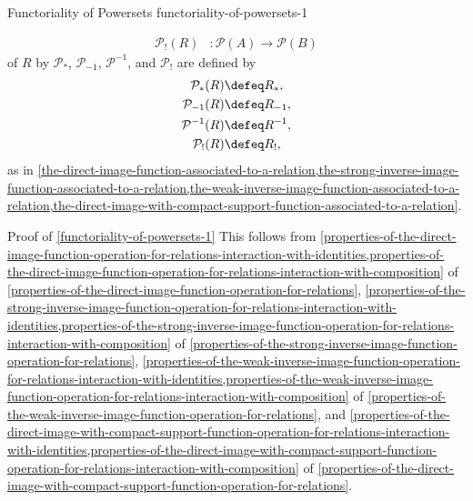 \begin{proposition}{Functoriality of Powersets \rmI}{functoriality-of-powersets-1}
\begin{itemize}
\begin{align*}
                \mathcal{P}_{!}(R)  &\colon \mathcal{P}(A) \to \mathcal{P}(B)%
            \end{align*}
            of $R$ by $\mathcal{P}_{*}$, $\mathcal{P}_{-1}$, $\mathcal{P}^{-1}$, and $\mathcal{P}_{!}$ are defined by
            \begin{align*}
                \mathcal{P}_{*}(R)  &\defeq R_{*},\\%
                \mathcal{P}_{-1}(R) &\defeq R_{-1},\\%
                \mathcal{P}^{-1}(R) &\defeq R^{-1},\\%
                \mathcal{P}_{!}(R)  &\defeq R_{!},%
            \end{align*}
            as in \cref{the-direct-image-function-associated-to-a-relation,the-strong-inverse-image-function-associated-to-a-relation,the-weak-inverse-image-function-associated-to-a-relation,the-direct-image-with-compact-support-function-associated-to-a-relation}.
    \end{itemize}
\end{proposition}
\begin{Proof}{Proof of \cref{functoriality-of-powersets-1}}%
    This follows from \cref{properties-of-the-direct-image-function-operation-for-relations-interaction-with-identities,properties-of-the-direct-image-function-operation-for-relations-interaction-with-composition} of \cref{properties-of-the-direct-image-function-operation-for-relations}, \cref{properties-of-the-strong-inverse-image-function-operation-for-relations-interaction-with-identities,properties-of-the-strong-inverse-image-function-operation-for-relations-interaction-with-composition} of \cref{properties-of-the-strong-inverse-image-function-operation-for-relations}, \cref{properties-of-the-weak-inverse-image-function-operation-for-relations-interaction-with-identities,properties-of-the-weak-inverse-image-function-operation-for-relations-interaction-with-composition} of \cref{properties-of-the-weak-inverse-image-function-operation-for-relations}, and \cref{properties-of-the-direct-image-with-compact-support-function-operation-for-relations-interaction-with-identities,properties-of-the-direct-image-with-compact-support-function-operation-for-relations-interaction-with-composition} of \cref{properties-of-the-direct-image-with-compact-support-function-operation-for-relations}.
\end{Proof}
